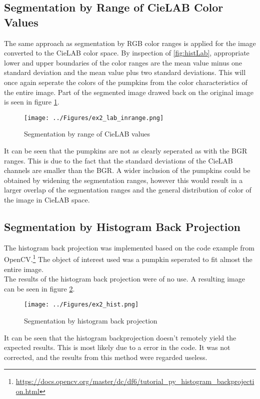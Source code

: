 \documentclass[../Head/Main.tex]{subfiles}
\begin{document}
\subsection{Segmentation by Range of CieLAB Color Values}
The same approach as segmentation by RGB color ranges is applied for the image converted to the CieLAB color space. By inspection of \ref{fig:histLab}, appropriate lower and upper boundaries of the color ranges are the mean value minus one standard deviation and the mean value plus two standard deviations. This will once again seperate the colors of the pumpkins from the color characteristics of the entire image. Part of the segmented image drawed back on the original image is seen in figure \ref{fig:labSeg}.

\begin{figure}[H]
\centering
\texttt{[image: ../Figures/ex2\_lab\_inrange.png]}
\caption{Segmentation by range of CieLAB values}
\label{fig:labSeg}
\end{figure}

It can be seen that the pumpkins are not as clearly seperated as with the BGR ranges. This is due to the fact that the standard deviations of the CieLAB channels are smaller than the BGR. A wider inclusion of the pumpkins could be obtained by widening the segmentation ranges, however this would result in a larger overlap of the segmentation ranges and the general distribution of color of the image in CieLAB space.

\subsection{Segmentation by Histogram Back Projection}
The histogram back projection was implemented based on the code example from OpenCV.\footnote{\url{https://docs.opencv.org/master/dc/df6/tutorial_py_histogram_backprojection.html}} The object of interest used was a pumpkin seperated to fit almost the entire image.\\
The results of the histogram back projection were of no use. A resulting image can be seen in figure \ref{fig:histSeg}.

\begin{figure}[H]
\centering
\texttt{[image: ../Figures/ex2\_hist.png]}
\caption{Segmentation by histogram back projection}
\label{fig:histSeg}
\end{figure}

It can be seen that the histogram backprojection doesn't remotely yield the expected results. This is most likely due to a error in the code. It was not corrected, and the results from this method were regarded useless.
\end{document}
